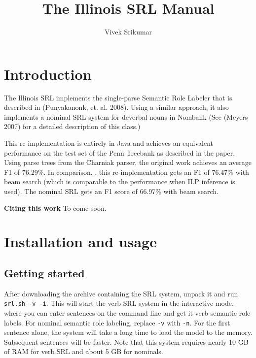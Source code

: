 \documentclass[11pt]{article}
\begin{document}
\title{The Illinois SRL Manual}
\author{Vivek Srikumar}
\date{}
\maketitle

\setcounter{tocdepth}{3}
\tableofcontents
\vspace*{1cm}

\section{Introduction}
\label{sec-1}

  The Illinois SRL implements the single-parse Semantic Role Labeler
  that is described in (Punyakanonk, et. al. 2008). Using a similar
  approach, it also implements a nominal SRL system for deverbal nouns
  in Nombank (See (Meyers 2007) for a detailed description of this
  class.)

  This re-implementation is entirely in Java and achieves an
  equivalent performance on the test set of the Penn Treebank as
  described in the paper. Using parse trees from the Charniak parser,
  the original work achieves an average F1 of 76.29\%. In comparison, ,
  this re-implementation gets an F1 of 76.47\% with beam search (which
  is comparable to the performance when ILP inference is used). The
  nominal SRL gets an F1 score of 66.97\% with beam search.

  

  \textbf{Citing this work} To come soon.
\section{Installation and usage}
\label{sec-2}
\subsection{Getting started}
\label{sec-2_1}

   After downloading the archive containing the SRL system, unpack it
   and run \texttt{srl.sh -v -i}. This will start the verb SRL system in the
   interactive mode, where you can enter sentences on the command line
   and get it verb semantic role labels. For nominal semantic role
   labeling, replace \texttt{-v} with \texttt{-n}.  For the first sentence alone,
   the system will take a long time to load the model to the
   memory. Subsequent sentences will be faster.  Note that this system
   requires nearly 10 GB of RAM for verb SRL and about 5 GB for
   nominals.
\end{document}
